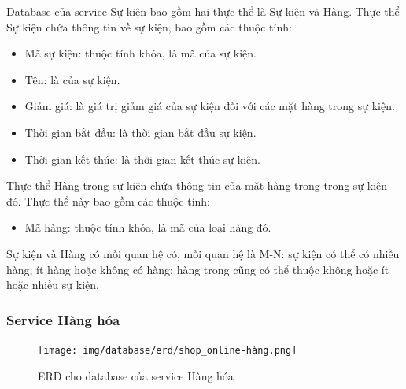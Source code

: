 \par Database của service Sự kiện bao gồm hai thực thể là Sự kiện và Hàng. Thực thể Sự kiện chứa thông tin về sự kiện, bao gồm các thuộc tính:
\begin{itemize}
    \item Mã sự kiện: thuộc tính khóa, là mã của sự kiện.
    \item Tên: là của sự kiện.
    \item Giảm giá: là giá trị giảm giá của sự kiện đối với các mặt hàng trong sự kiện.
    \item Thời gian bắt đầu: là thời gian bắt đầu sự kiện.
    \item Thời gian kết thúc: là thời gian kết thúc sự kiện.
\end{itemize}

\par Thực thể Hàng trong sự kiện chứa thông tin của mặt hàng trong trong sự kiện đó. Thực thể này bao gồm các thuộc tính:
\begin{itemize}
    \item Mã hàng: thuộc tính khóa, là mã của loại hàng đó.
\end{itemize}

\par Sự kiện và Hàng có mối quan hệ có, mối quan hệ là M-N: sự kiện có thể có nhiều hàng, ít hàng hoặc không có hàng; hàng trong cũng có thể thuộc không hoặc ít hoặc nhiều sự kiện.

\subsubsection{Service Hàng hóa}
\begin{figure}[!htp]
    \begin{center}
        \texttt{[image: img/database/erd/shop\_online-hàng.png]}
        \newline
        \caption{ERD cho database của service Hàng hóa}
    \end{center}
\end{figure}

